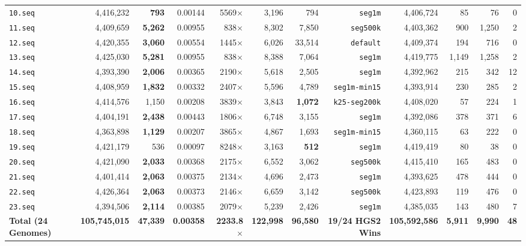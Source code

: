 \documentclass[10pt]{article}
\theoremstyle{definition}
\begin{document}
\begin{table}[h!]
{\begin{tabular}{lrrrrrrrrrrr}
\texttt{10.seq} & 4,416,232 & \textbf{793} & 0.00144 & 5569$\times$ & 3,196 & 794 & \texttt{seg1m} & 4,406,724 & 85 & 76 & 0 \\
\texttt{11.seq} & 4,409,659 & \textbf{5,262} & 0.00955 & 838$\times$ & 8,302 & 7,850 & \texttt{seg500k} & 4,403,362 & 900 & 1,250 & 2 \\
\texttt{12.seq} & 4,420,355 & \textbf{3,060} & 0.00554 & 1445$\times$ & 6,026 & 33,514 & \texttt{default} & 4,409,374 & 194 & 716 & 0 \\
\texttt{13.seq} & 4,425,030 & \textbf{5,281} & 0.00955 & 838$\times$ & 8,388 & 7,064 & \texttt{seg1m} & 4,419,775 & 1,149 & 1,258 & 2 \\
\texttt{14.seq} & 4,393,390 & \textbf{2,006} & 0.00365 & 2190$\times$ & 5,618 & 2,505 & \texttt{seg1m} & 4,392,962 & 215 & 342 & 12 \\
\texttt{15.seq} & 4,408,959 & \textbf{1,832} & 0.00332 & 2407$\times$ & 5,596 & 4,789 & \texttt{seg1m-min15} & 4,393,914 & 230 & 285 & 2 \\
\texttt{16.seq} & 4,414,576 & 1,150 & 0.00208 & 3839$\times$ & 3,843 & \textbf{1,072} & \texttt{k25-seg200k} & 4,408,020 & 57 & 224 & 1 \\
\texttt{17.seq} & 4,404,191 & \textbf{2,438} & 0.00443 & 1806$\times$ & 6,748 & 3,155 & \texttt{seg1m} & 4,392,086 & 378 & 371 & 6 \\
\texttt{18.seq} & 4,363,898 & \textbf{1,129} & 0.00207 & 3865$\times$ & 4,867 & 1,693 & \texttt{seg1m-min15} & 4,360,115 & 63 & 222 & 0 \\
\texttt{19.seq} & 4,421,179 & 536 & 0.00097 & 8248$\times$ & 3,163 & \textbf{512} & \texttt{seg1m} & 4,419,419 & 80 & 38 & 0 \\
\texttt{20.seq} & 4,421,090 & \textbf{2,033} & 0.00368 & 2175$\times$ & 6,552 & 3,062 & \texttt{seg500k} & 4,415,410 & 165 & 483 & 0 \\
\texttt{21.seq} & 4,401,414 & \textbf{2,063} & 0.00375 & 2134$\times$ & 4,696 & 2,473 & \texttt{seg1m} & 4,393,625 & 478 & 444 & 0 \\
\texttt{22.seq} & 4,426,364 & \textbf{2,063} & 0.00373 & 2146$\times$ & 6,659 & 3,142 & \texttt{seg500k} & 4,423,893 & 119 & 476 & 0 \\
\texttt{23.seq} & 4,394,506 & \textbf{2,114} & 0.00385 & 2079$\times$ & 5,239 & 2,426 & \texttt{seg1m} & 4,385,035 & 143 & 480 & 7 \\
\midrule
\textbf{Total (24 Genomes)} & \textbf{105,745,015} & \textbf{47,339} & \textbf{0.00358} & \textbf{2233.8$\times$} & \textbf{122,998} & \textbf{96,580} & \textbf{19/24 HGS2 Wins} & \textbf{105,592,586} & \textbf{5,911} & \textbf{9,990} & \textbf{48} \\
\bottomrule
\end{tabular}%
}
\end{table}
\end{document}
